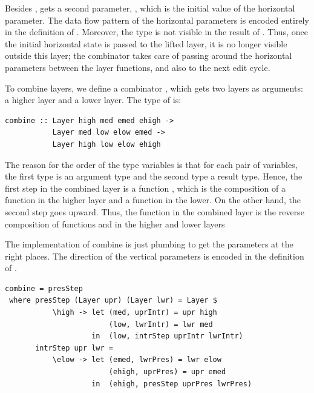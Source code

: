 \documentclass[preprint,natbib]{sigplanconf}
\begin{document}
Besides ,  gets a second parameter, , which is the initial value of the horizontal parameter. The data flow pattern of the horizontal parameters is encoded entirely in the definition of . Moreover, the  type is not visible in the result of . Thus, once the initial horizontal state is passed to the lifted layer, it is no longer visible outside this layer; the  combinator takes care of passing around the horizontal parameters between the layer functions, and also to the next edit cycle. 



To combine layers, we define a combinator , which gets two layers as arguments: a higher layer and a lower layer. The type of  is:

\begin{small}
\begin{verbatim}
combine :: Layer high med emed ehigh -> 
           Layer med low elow emed -> 
           Layer high low elow ehigh
\end{verbatim}
\end{small}

The reason for the order of the type variables is that for each pair of variables, the first type is an argument type and the second type  a result type. Hence, the first step in the combined layer is a function , which is the composition of a function  in the higher layer and a function  in the lower. On the other hand, the second step goes upward.  Thus, the function  in the combined layer is the reverse composition of functions  and  in the higher and lower layers
  
The implementation of combine is just plumbing to get the parameters at the right places. The direction of the vertical parameters is encoded in the definition of . 


\begin{small}
\begin{verbatim}
combine = presStep
 where presStep (Layer upr) (Layer lwr) = Layer $ 
           \high -> let (med, uprIntr) = upr high
                        (low, lwrIntr) = lwr med
                    in  (low, intrStep uprIntr lwrIntr)
       intrStep upr lwr = 
           \elow -> let (emed, lwrPres) = lwr elow
                        (ehigh, uprPres) = upr emed
                    in  (ehigh, presStep uprPres lwrPres)
\end{verbatim}%
\end{small}
\end{document}
